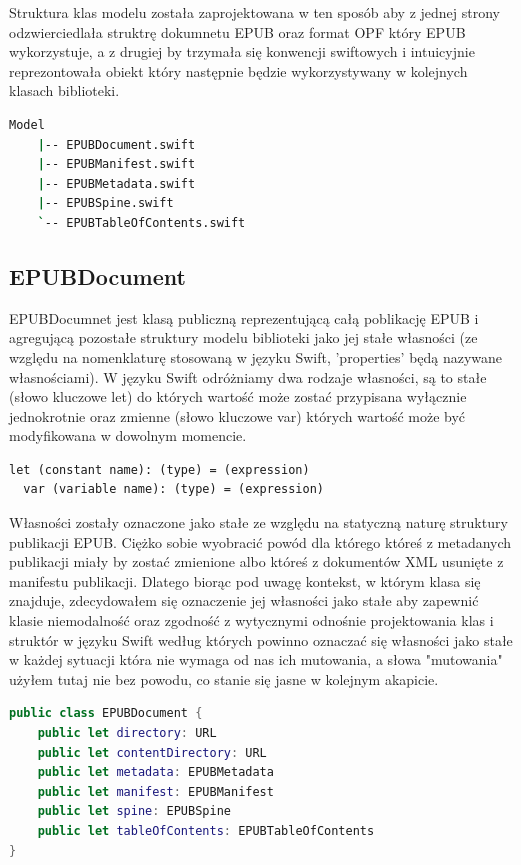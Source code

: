 Struktura klas modelu została zaprojektowana w ten sposób aby z jednej strony odzwierciedlała struktrę dokumnetu EPUB oraz format OPF który EPUB wykorzystuje, a z drugiej by trzymała się konwencji swiftowych i intuicyjnie reprezontowała obiekt który następnie będzie wykorzystywany w kolejnych klasach biblioteki.

\begin{lstlisting}[caption={Struktura modelu EPUBKit.}, language=bash]
    Model
    |-- EPUBDocument.swift
    |-- EPUBManifest.swift
    |-- EPUBMetadata.swift
    |-- EPUBSpine.swift
    `-- EPUBTableOfContents.swift
\end{lstlisting}

\subsection{EPUBDocument}
\label{EPUBDocument}
EPUBDocumnet jest klasą publiczną reprezentującą całą poblikację EPUB i agregującą pozostałe struktury modelu biblioteki jako jej stałe własności (ze względu na nomenklaturę stosowaną w języku Swift, 'properties' będą nazywane własnościami). W języku Swift odróżniamy dwa rodzaje własności, są to stałe (słowo kluczowe let) do których wartość może zostać przypisana wyłącznie jednokrotnie oraz zmienne (słowo kluczowe var) których wartość może być modyfikowana w dowolnym momencie.

\begin{lstlisting}[caption={Deklaracje własności w Swifcie.\cite{theSwiftProgrammingLanguageDeclarations}}, language=swift-reference]
  let (constant name): (type) = (expression)
  var (variable name): (type) = (expression)
\end{lstlisting}

Własności zostały oznaczone jako stałe ze względu na statyczną naturę struktury publikacji EPUB. Ciężko sobie wyobracić powód dla którego któreś z metadanych publikacji miały by zostać zmienione albo któreś z dokumentów XML usunięte z manifestu publikacji. Dlatego biorąc pod uwagę kontekst, w którym klasa się znajduje, zdecydowałem się oznaczenie jej własności jako stałe aby zapewnić klasie niemodalność oraz zgodność z wytycznymi odnośnie projektowania klas i struktór w języku Swift według których powinno oznaczać się własności jako stałe w każdej sytuacji która nie wymaga od nas ich mutowania, a słowa "mutowania" użyłem tutaj nie bez powodu, co stanie się jasne w kolejnym akapicie.

\begin{lstlisting}[caption={Klasa EPUBDocument i jej stałe publiczne.}, language=swift]
public class EPUBDocument {
    public let directory: URL
    public let contentDirectory: URL
    public let metadata: EPUBMetadata
    public let manifest: EPUBManifest
    public let spine: EPUBSpine
    public let tableOfContents: EPUBTableOfContents
}
\end{lstlisting}

